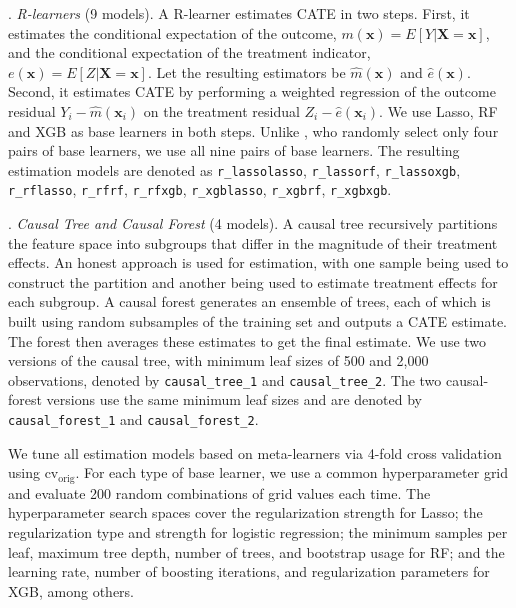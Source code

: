 \documentclass[12pt]{article}
\begin{document}
\vspace{0.3cm}

. {\it R-learners} (9 models). A R-learner \citep{nie2021} estimates CATE in two steps. First, it estimates the conditional expectation of the outcome, $m(\bm{x})=E[Y|\bm{X}=\bm{x}]$, and the conditional expectation of the treatment indicator, $e(\bm{x})=E[Z|\bm{X}=\bm{x}]$. Let the resulting estimators be $\widehat{m}(\bm{x})$ and $\widehat{e}(\bm{x})$. Second, it estimates CATE by performing a weighted regression of the outcome residual $Y_i-\widehat{m}(\bm{x}_i)$ on the treatment residual $Z_i-\widehat{e}(\bm{x}_i)$. We use Lasso, RF and XGB as base learners in both steps. Unlike \cite{dwivedi2020}, who randomly select only four pairs of base learners, we use all nine pairs of base learners. The resulting estimation models are denoted as \texttt{r\_lassolasso}, \texttt{r\_lassorf}, \texttt{r\_lassoxgb}, \texttt{r\_rflasso}, \texttt{r\_rfrf}, \texttt{r\_rfxgb}, \texttt{r\_xgblasso}, \texttt{r\_xgbrf}, \texttt{r\_xgbxgb}.

\vspace{0.3cm}

. {\it Causal Tree and Causal Forest} (4 models). A causal tree \citep{athey2016} recursively partitions the feature space into subgroups that differ in the magnitude of their treatment effects. An honest approach is used for estimation, with one sample being used to construct the partition and another being used to estimate treatment effects for each subgroup. A causal forest \citep{wager2018} generates an ensemble of trees, each of which is built using random subsamples of the training set and outputs a CATE estimate. The forest then averages these estimates to get the final estimate. We use two versions of the causal tree, with minimum leaf sizes of 500 and 2,000 observations, denoted by \texttt{causal\_tree\_1} and \texttt{causal\_tree\_2}. The two causal-forest versions use the same minimum leaf sizes and are denoted by \texttt{causal\_forest\_1} and \texttt{causal\_forest\_2}.

\vspace{0.3cm}

We tune all estimation models based on meta-learners via 4-fold cross validation using $\text{cv}_\text{orig}$. For each type of base learner, we use a common hyperparameter grid and evaluate 200 random combinations of grid values each time. The hyperparameter search spaces cover the regularization strength for Lasso; the regularization type and strength for logistic regression; the minimum samples per leaf, maximum tree depth, number of trees, and bootstrap usage for RF; and the learning rate, number of boosting iterations, and regularization parameters for XGB, among others.
\end{document}

